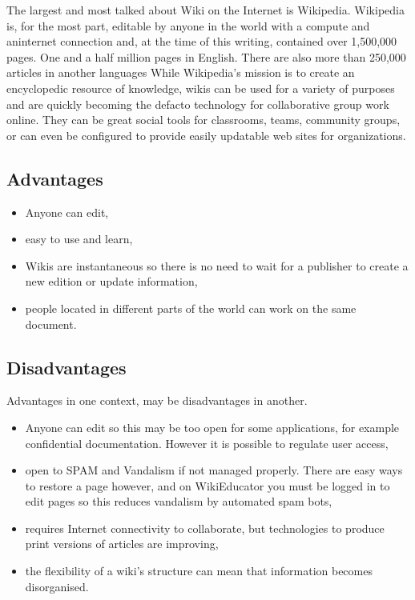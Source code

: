 \documentclass[12pt,a4paper]{report}
\begin{document}
	The largest and most talked about Wiki on the Internet is Wikipedia. Wikipedia is, for the most part, editable by anyone in the world with a compute and aninternet connection and, at the time of this writing, contained over 1,500,000 pages. One and a half million pages in English. There are also more than 250,000 articles in another languages While Wikipedia's mission is to create an encyclopedic resource of knowledge, wikis can be used for a variety of purposes and are quickly becoming the defacto technology for collaborative group work online. They can be great social tools for classrooms, teams, community groups, or can even be configured to provide easily updatable web sites for organizations. \cite{wiki}


\newpage
	\subsection{Advantages}
\begin{itemize}
	\item Anyone can edit,
	\item easy to use and learn,
	\item Wikis are instantaneous so there is no need to wait for a publisher to create a new edition or update information,
	\item people located in different parts of the world can work on the same document.
\end{itemize}	
	\subsection{Disadvantages}
	Advantages in one context, may be disadvantages in another.
\begin{itemize}
	\item Anyone can edit so this may be too open for some applications, for example
	confidential documentation. However it is possible to regulate user access,
	\item open to SPAM and Vandalism if not managed properly. There are easy ways to restore
	a page however, and on WikiEducator you must be logged in to edit pages so this
	reduces vandalism by automated spam bots,
	\item requires Internet connectivity to collaborate, but technologies to produce print versions of articles are improving,
	\item the flexibility of a wiki's structure can mean that information becomes disorganised.
\end{itemize}	
\end{document}
